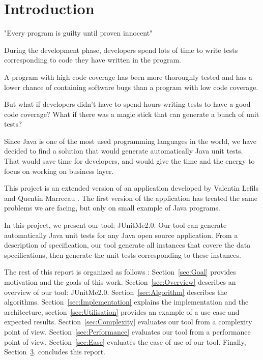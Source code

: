 \chapter*{Introduction}
	\thispagestyle{introduction}
	"Every program is guilty until proven innocent"
	
	During the development phase, developers spend lots of time to write tests corresponding to code they have written in the program.
	
	A program with high code coverage has been more thoroughly tested and has a lower chance of containing software bugs than a program with low code coverage.\cite{CodeCoverage}
	
	But what if developers didn't have to spend hours writing tests to have a good code coverage? What if there was a magic stick that can generate a bunch of unit tests? 
	
Since Java is one of the most used programming languages in the world, we have decided to find a solution that would generate automatically Java unit tests. That would save time for developers, and would give the time and the energy to focus on working on business layer.

This project is an extended version of an application developed by Valentin Lefils and Quentin Marrecau \cite{JUnitMeRapport} \cite{JUnitMeGitHub} . The first version of the application has treated the same problems we are facing, but only on small example of Java programs.

In this project, we present our tool: JUnitMe2.0. Our tool can generate automatically Java unit tests for any Java open source application. From a description of specification, our tool generate all instances that covere the data specifications, then generate the unit tests corresponding to these instances.
  
The rest of this report is organized as follows : Section~\ref{sec:Goal} provides motivation and the goals of this work.
Section~\ref{sec:Overview} describes an overview of our tool: JUnitMe2.0.
Section~\ref{sec:Algorithm} describes the algorithms. Section~\ref{sec:Implementation} explains the implementation and the architecture, section~\ref{sec:Utilisation} provides an example of a use case and expected results.
Section~\ref{sec:Complexity} evaluates our tool from a complexity point of view. Section~\ref{sec:Performance} evaluates our tool from a performance point of view. Section~\ref{sec:Ease} evaluates the ease of use of our tool.
Finally, Section~\hyperref[ch:Conclusion]{3}. concludes this report.